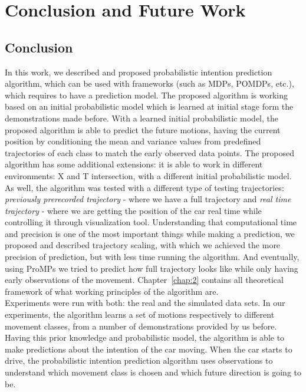 \chapter{Conclusion and Future Work}
\label{chap:6}
%
\section{Conclusion}

In this work, we described and proposed probabilistic intention prediction algorithm, which can be used with frameworks (such as \glspl{MDP}, \glspl{POMDP}, etc.), which requires to have a prediction model. The proposed algorithm is working based on an initial probabilistic model which is learned at initial stage form the demonstrations made before. With a learned initial probabilistic model, the proposed algorithm is able to predict the future motions, having the current position by conditioning the mean and variance values from predefined trajectories of each class to match the early observed data points. The proposed algorithm has some additional extensions: it is able to work in different environments: X and T intersection, with a different initial probabilistic model. As well, the algorithm was tested with a different type of testing trajectories: \textit{previously prerecorded trajectory} - where we have a full trajectory and \textit{real time trajectory} - where we are getting the position of the car real time while controlling it through visualization tool. Understanding that computational time and precision is one of the most important things while making a prediction, we proposed and described trajectory scaling, with which we achieved the more precision of prediction, but with less time running the algorithm. And eventually, using \gls{ProMPs} we tried to predict how full trajectory looks like while only having early observations of the movement. Chapter~\ref{chap:2} contains all theoretical framework of what working principles of the algorithm are. \\
Experiments were run with both: the real and the simulated data sets. In our experiments, the algorithm learns a set of motions respectively to different movement classes, from a number of demonstrations provided by us before. Having this prior knowledge and probabilistic model, the algorithm is able to make predictions about the intention of the car moving. When the car starts to drive, the probabilistic intention prediction algorithm uses observations to understand which movement class is chosen and which future direction is going to be. \\
